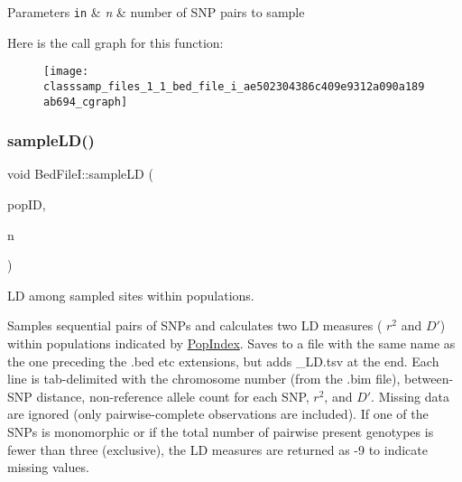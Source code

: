 \begin{DoxyParams}[1]{Parameters}
\mbox{\tt in}  & {\em n} & number of S\+NP pairs to sample \\
\hline
\end{DoxyParams}
Here is the call graph for this function\+:\nopagebreak
\begin{figure}[H]
\begin{center}
\leavevmode
\texttt{[image: classsamp\_files\_1\_1\_bed\_file\_i\_ae502304386c409e9312a090a189ab694\_cgraph]}
\end{center}
\end{figure}
\mbox{\label{classsamp_files_1_1_bed_file_i_aca4f3b7ba7fa45b6a0ed1341606858f1}} 
\subsubsection{\texorpdfstring{sample\+L\+D()}{sampleLD()}\hspace{0.1cm}{\footnotesize\ttfamily [2/2]}}
{\footnotesize\ttfamily void Bed\+File\+I\+::sample\+LD (\begin{DoxyParamCaption}\item[{const \hyperlink{classsamp_files_1_1_pop_index}{Pop\+Index} \&}]{pop\+ID,  }\item[{const uint64\+\_\+t \&}]{n }\end{DoxyParamCaption})}



LD among sampled sites within populations. 

Samples sequential pairs of S\+N\+Ps and calculates two LD measures ( $ r^2 $ and $ D' $) within populations indicated by {\ttfamily \hyperlink{classsamp_files_1_1_pop_index}{Pop\+Index}}. Saves to a file with the same name as the one preceding the .bed etc extensions, but adds \+\_\+\+L\+D.\+tsv at the end. Each line is tab-\/delimited with the chromosome number (from the .bim file), between-\/\+S\+NP distance, non-\/reference allele count for each S\+NP, $ r^2 $, and $ D' $. Missing data are ignored (only pairwise-\/complete observations are included). If one of the S\+N\+Ps is monomorphic or if the total number of pairwise present genotypes is fewer than three (exclusive), the LD measures are returned as -\/9 to indicate missing values.


